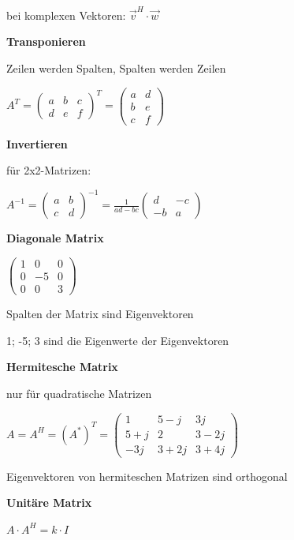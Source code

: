 bei komplexen Vektoren:
$\displaystyle{
    \vec{v}^H \cdot \vec{w}
}$

\textbf{Transponieren}

Zeilen werden Spalten, Spalten werden Zeilen

$\displaystyle{
    A^T =
    \begin{pmatrix}
        a & b & c\\
        d & e & f
    \end{pmatrix}^T
    =
    \begin{pmatrix}
        a & d\\
        b & e\\
        c & f
    \end{pmatrix}
}$

\textbf{Invertieren}

für 2x2-Matrizen:

$\displaystyle{
    A^{-1} =
    \begin{pmatrix}
        a & b\\
        c & d
    \end{pmatrix}^{-1}
    = \frac{1}{ad - bc}
    \begin{pmatrix}
        d & -c\\
        -b & a
    \end{pmatrix}
}$

\textbf{Diagonale Matrix}

$\displaystyle{
    \begin{pmatrix}
        1 & 0 & 0\\
        0 & -5 & 0\\
        0 & 0 & 3
    \end{pmatrix}
}$

Spalten der Matrix sind Eigenvektoren

1; -5; 3 sind die Eigenwerte der Eigenvektoren

\textbf{Hermitesche Matrix}

nur für quadratische Matrizen

$\displaystyle{
    A = A^H = (A^*)^T =
    \begin{pmatrix}
        1 & 5 - j & 3j\\
        5 + j & 2 & 3 - 2j\\
        -3j & 3 + 2j & 3 +4j
    \end{pmatrix}
}$

Eigenvektoren von hermiteschen Matrizen sind orthogonal

\textbf{Unitäre Matrix}

$\displaystyle{
    A \cdot A^H = k \cdot I
}$

